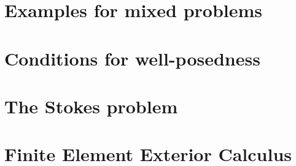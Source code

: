 \maketitle

% 

\tableofcontents

\chapter{Examples for mixed problems}


\chapter{Conditions for well-posedness}


\chapter{The Stokes problem}


\chapter{Finite Element Exterior Calculus}


\printbibliography
\printindex


